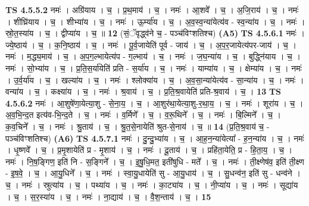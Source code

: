 \documentclass[17pt]{extarticle}
\begin{document}
                  \newline
                                \textbf{ TS 4.5.5.2} \newline
                  नमः॑ । अग्रि॑याय । च॒ । प्र॒थ॒माय॑ । च॒ । नमः॑ । आ॒शवे᳚ । च॒ । अ॒जि॒राय॑ । च॒ । नमः॑ । शीघ्रि॑याय । च॒ । शीभ्या॑य । च॒ । नमः॑ । ऊ॒र्म्या॑य । च॒ । अ॒व॒स्व॒न्या॑येत्य॑व - स्व॒न्या॑य । च॒ । नमः॑ । स्रो॒त॒स्या॑य । च॒ । द्वीप्या॑य । च॒ ॥ \textbf{  12 } \newline
                  \newline
                      (सं॒ॅवृद्ध्व॑ने च॒ - पञ्च॑विꣳशतिश्च)  \textbf{(A5)} \newline \newline
                                \textbf{ TS 4.5.6.1} \newline
                  नमः॑ । ज्ये॒ष्ठाय॑ । च॒ । क॒नि॒ष्ठाय॑ । च॒ । नमः॑ । पू॒र्व॒जायेति॑ पूर्व - जाय॑ । च॒ । अ॒प॒र॒जायेत्य॑पर-जाय॑ । च॒ । नमः॑ । म॒द्ध्य॒माय॑ । च॒ । अ॒प॒ग॒ल्भायेत्य॑प - ग॒ल्भाय॑ । च॒ । नमः॑ । ज॒घ॒न्या॑य । च॒ । बुद्ध्नि॑याय । च॒ । नमः॑ । सो॒भ्या॑य । च॒ । प्र॒ति॒स॒र्या॑येति॑ प्रति - स॒र्या॑य । च॒ । नमः॑ । याम्या॑य । च॒ । क्षेम्या॑य । च॒ । नमः॑ । उ॒र्व॒र्या॑य । च॒ । खल्या॑य । च॒ । नमः॑ । श्लोक्या॑य । च॒ । अ॒व॒सा॒न्या॑येत्य॑व - सा॒न्या॑य । च॒ । नमः॑ । वन्या॑य । च॒ । कक्ष्या॑य । च॒ । नमः॑ । श्र॒वाय॑ । च॒ । प्र॒ति॒श्र॒वायेति॑ प्रति-श्र॒वाय॑ । च॒ । \textbf{  13} \newline
                  \newline
                                \textbf{ TS 4.5.6.2} \newline
                  नमः॑ । आ॒शुषे॑णा॒येत्या॒शु - से॒ना॒य॒ । च॒ । आ॒शुर॑था॒येत्या॒शु-र॒था॒य॒ । च॒ । नमः॑ । शूरा॑य । च॒ । अ॒व॒भि॒न्द॒त इत्य॑व-भि॒न्द॒ते । च॒ । नमः॑ । व॒र्मिणे᳚ । च॒ । व॒रू॒थिने᳚ । च॒ । नमः॑ । बि॒ल्मिने᳚ । च॒ । क॒व॒चिने᳚ । च॒ । नमः॑ । श्रु॒ताय॑ । च॒ । श्रु॒त॒से॒नायेति॑ श्रुत-से॒नाय॑ । च॒ ॥ \textbf{  14} \newline
                  \newline
                      (प्र॒ति॒श्र॒वाय॑ च॒ - पञ्च॑विꣳशतिश्च)  \textbf{(A6)} \newline \newline
                                \textbf{ TS 4.5.7.1} \newline
                  नमः॑ । दु॒न्दु॒भ्या॑य । च॒ । आ॒ह॒न॒न्या॑येत्या᳚ - ह॒न॒न्या॑य । च॒ । नमः॑ । धृ॒ष्णवे᳚ । च॒ । प्र॒मृ॒शायेति॑ प्र - मृ॒शाय॑ । च॒ । नमः॑ । दू॒ताय॑ । च॒ । प्रहि॑ता॒येति॒ प्र - हि॒ता॒य॒ । च॒ । नमः॑ । नि॒ष॒ङ्गिण॒ इति॑ नि - स॒ङ्गिने᳚ । च॒ । इ॒षु॒धि॒मत॒ इती॑षुधि - मते᳚ । च॒ । नमः॑ । ती॒क्ष्णेष॑व॒ इति॑ ती॒क्ष्ण - इ॒ष॒वे॒ । च॒ । आ॒यु॒धिने᳚ । च॒ । नमः॑ । स्वा॒यु॒धायेति॑ सु - आ॒यु॒धाय॑ । च॒ । सु॒धन्व॑न॒ इति॑ सु - धन्व॑ने । च॒ । नमः॑ । स्रुत्या॑य । च॒ । पथ्या॑य । च॒ । नमः॑ । का॒ट्या॑य । च॒ । नी॒प्या॑य । च॒ । नमः॑ । सूद्या॑य । च॒ । स॒र॒स्या॑य । च॒ । नमः॑ । ना॒द्याय॑ । च॒ । वै॒श॒न्ताय॑ । च॒ । \textbf{  15} \newline
\end{document}
